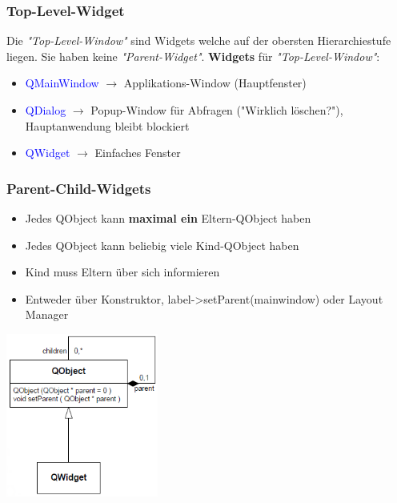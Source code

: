 \begin{multicols}{3}
\subsubsection{Top-Level-Widget}
Die \textit{"Top-Level-Window"} sind Widgets welche auf der obersten \newline Hierarchiestufe liegen. Sie haben \newline keine \textit{"Parent-Widget"}.\newline
\textbf{Widgets} für \textit{"Top-Level-Window"}: 
\begin{itemize}
	\item \textcolor{blue}{QMainWindow} $\rightarrow$ Applikations-Window (Hauptfenster)
	\item \textcolor{blue}{QDialog} $\rightarrow$ Popup-Window für Abfragen ("Wirklich löschen?"), Hauptanwendung bleibt blockiert
	\item \textcolor{blue}{QWidget} $\rightarrow$ Einfaches Fenster
\end{itemize}

\subsubsection{Parent-Child-Widgets}
\begin{itemize}
	\item Jedes QObject kann \textbf{maximal ein} Eltern-QObject haben
	\item Jedes QObject kann beliebig \newline viele Kind-QObject haben
	\item Kind muss Eltern über sich \newline informieren
	\item Entweder über Konstruktor, \newline label->setParent(mainwindow) oder Layout Manager
\end{itemize}

\includegraphics[width=5cm]{images/qt_parent_child.png}
\end{multicols}

